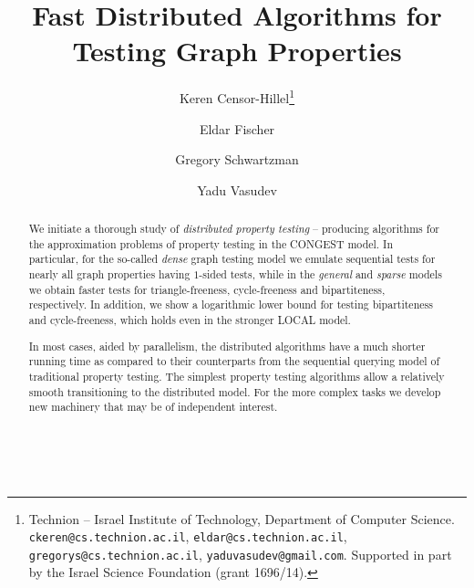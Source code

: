 \documentclass[11pt]{article}
\newcommand*\samethanks[1][\value{footnote}]{\footnotemark[#1]}
\newcommand{\poly}{\textrm{poly}}
\begin{document}
\begin{titlepage}
\title{Fast Distributed Algorithms for Testing Graph Properties}
\author{Keren Censor-Hillel\thanks{Technion -- Israel Institute of Technology, Department of Computer
  Science. \texttt{ckeren@cs.technion.ac.il},
  \texttt{eldar@cs.technion.ac.il}, \texttt{gregorys@cs.technion.ac.il},
  \texttt{yaduvasudev@gmail.com}. Supported in part by the Israel Science Foundation (grant 1696/14).}
	\and Eldar Fischer\samethanks \and Gregory Schwartzman\samethanks \and Yadu Vasudev\samethanks }

\maketitle
	
\begin{abstract}
We initiate a thorough study of \emph{distributed property testing} -- producing algorithms for the approximation problems of property testing in the CONGEST model. In particular, for the so-called \emph{dense} graph testing model we emulate sequential tests for nearly all graph properties having $1$-sided tests, while in the \emph{general} and \emph{sparse} models we obtain faster tests for triangle-freeness, cycle-freeness and bipartiteness, respectively. In addition, we show a logarithmic lower bound for testing bipartiteness and cycle-freeness, which holds even in the stronger LOCAL model.

In most cases, aided by parallelism, the distributed algorithms have a much shorter running time as compared to their counterparts from the sequential querying model of traditional property testing. The simplest property testing algorithms allow a relatively smooth transitioning to the distributed model. For the more complex tasks we develop new machinery that may be of independent interest.
\end{abstract}


~
\thispagestyle{empty}
\end{titlepage}

\newcommand{\ThmSim}
{
Any $\epsilon$-test in the dense graph model for a non-disjointed property that makes $q$ queries can be converted to a distributed $\epsilon$-test that takes $O(q^2)$ communication rounds.
}
\newcommand{\ThmTri}{
Algorithm~\ref{alg:triangle-freeness} is a distributed $\epsilon$-test in the general graph model for the property of containing no triangles, that requires $O(\epsilon^{-2})$ rounds.
}
\newcommand{\ThmBi}{
Algorithm~\ref{alg:dist-bip-test-det} is a distributed $\epsilon$-test in the bounded degree graph model for the property of being bipartite, that requires $O(\poly{(\epsilon^{-1} \log(n \epsilon^{-1}))})$ rounds.
}
\newcommand{\ThmCycle}{
Algorithm~\ref{alg:test-cycle-free} is a distributed $\epsilon$-test in the general graph model
for the property of being cycle-free, that requires $O(\log n/\epsilon)$ rounds.
}
\newcommand{\ThmLBBi}{
Any distributed $1/100$-test for the property of being bipartite requires
$\Omega(\log n)$ rounds of communication.
}
\newcommand{\ThmLBCycle}{
Any distributed $1/100$-test for the property of being cycle-free requires
$\Omega(\log n)$ rounds of communication.
}
\end{document}
